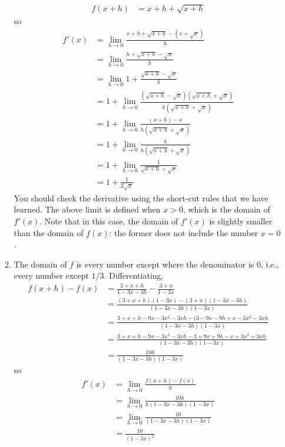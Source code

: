 \documentclass{article}
\begin{document}
\begin{enumerate}
\begin{enumerate}
    \begin{align*}
      f(x+h) &= x+h+\sqrt{x+h}
    \end{align*}
    so
    \begin{align*}
      f'(x) &= \lim_{h\to 0} \frac{x+h+\sqrt{x+h} - (x+\sqrt{x})}{h}
      \\
      &= \lim_{h\to 0} \frac{h+\sqrt{x+h}-\sqrt{x}}{h}
      \\
      &= \lim_{h\to 0} 1 + \frac{\sqrt{x+h}-\sqrt{x}}{h}
      \\
      &= 1 + \lim_{h\to 0} \frac{(\sqrt{x+h}-\sqrt{x})(\sqrt{x+h}+\sqrt{x})}{
        h(\sqrt{x+h}+\sqrt{x})}
      \\
      &= 1 + \lim_{h\to 0} \frac{(x+h)-x}{ h(\sqrt{x+h}+\sqrt{x})}
      \\
      &= 1 + \lim_{h\to 0} \frac{h}{h(\sqrt{x+h}+\sqrt{x})}
      \\
      &= 1 + \lim_{h\to 0} \frac{1}{\sqrt{x+h}+\sqrt{x}}
      \\
      &= 1 + \frac{1}{2\sqrt{x}}
    \end{align*}
    You should check the derivative using the short-cut rules that we have
    learned.
    The above limit is defined when $x>0$, which is the domain of $f'(x)$.
    Note that in this case, the domain of $f'(x)$ is slightly smaller than
    the domain of $f(x)$: the former does not include the number $x=0$.
  \item %
    The domain of $f$ is every number except where the denominator is
    $0$, i.e., every number except $1/3$.  Differentiating,
    \begin{align*}
      f(x+h) -f(x) &= \frac{3+x+h}{1-3x-3h} - \frac{3+x}{1-3x}
      \\
      &= \frac{(3+x+h)(1-3x)-(3+x)(1-3x-3h)}{(1-3x-3h)(1-3x)}
      \\
      &= \frac{3+x+h-9x-3x^2-3xh-(3-9x-9h+x-3x^2-3xh}{(1-3x-3h)(1-3x)}
      \\
      &= \frac{3+x+h-9x-3x^2-3xh-3+9x+9h-x+3x^2+3xh}{(1-3x-3h)(1-3x)}
      \\
      &= \frac{10h}{(1-3x-3h)(1-3x)}
    \end{align*}
    so
    \begin{align*}
      f'(x) &= \lim_{h\to 0} \frac{f(x+h)-f(x)}{h}
      \\
      &= \lim_{h\to 0} \frac{10h}{h(1-3x-3h)(1-3x)}
      \\
      &= \lim_{h\to 0} \frac{10}{(1-3x-3h)(1-3x)}
      \\
      &= \frac{10}{(1-3x)^2}

\end{align*}
\end{enumerate}
\end{enumerate}
\end{document}

